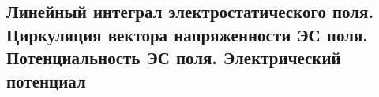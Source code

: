\subsection{Линейный интеграл электростатического поля. Циркуляция вектора напряженности ЭС поля. Потенциальность ЭС поля. Электрический потенциал}
